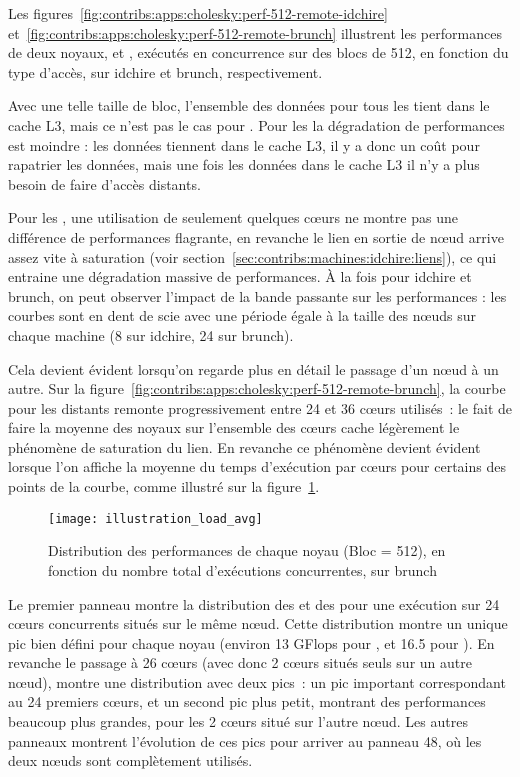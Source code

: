 Les figures~\ref{fig:contribs:apps:cholesky:perf-512-remote-idchire} et~\ref{fig:contribs:apps:cholesky:perf-512-remote-brunch} illustrent les performances de deux noyaux, \gemm et \potrf, exécutés en concurrence sur des blocs de 512, en fonction du type d'accès, sur idchire et brunch, respectivement.

Avec une telle taille de bloc, l'ensemble des données pour tous les \potrf tient dans le cache L3, mais ce n'est pas le cas pour \gemm.
Pour les \potrf la dégradation de performances est moindre : les données tiennent dans le cache L3, il y a donc un coût pour rapatrier les données, mais une fois les données dans le cache L3 il n'y a plus besoin de faire d'accès distants.

Pour les \gemm, une utilisation de seulement quelques cœurs ne montre pas une différence de performances flagrante, en revanche le lien en sortie de nœud arrive assez vite à saturation (voir section~\ref{sec:contribs:machines:idchire:liens}), ce qui entraine une dégradation massive de performances.
À la fois pour idchire et brunch, on peut observer l'impact de la bande passante sur les performances : les courbes sont en dent de scie avec une période égale à la taille des nœuds sur chaque machine (8 sur idchire, 24 sur brunch).

Cela devient évident lorsqu'on regarde plus en détail le passage d'un nœud à un autre.
Sur la figure~\ref{fig:contribs:apps:cholesky:perf-512-remote-brunch}, la courbe pour les \gemm distants remonte progressivement entre 24 et 36 cœurs utilisés~: le fait de faire la moyenne des noyaux sur l'ensemble des cœurs cache légèrement le phénomène de saturation du lien.
En revanche ce phénomène devient évident lorsque l'on affiche la moyenne du temps d'exécution par cœurs pour certains des points de la courbe, comme illustré sur la figure~\ref{fig:contribs:apps:cholesky:distrib-load-512}.

\begin{figure}[ht]
  \centering
  \texttt{[image: illustration\_load\_avg]}
  \caption{Distribution des performances de chaque noyau (Bloc = 512), en fonction du nombre total d'exécutions concurrentes, sur brunch}\label{fig:contribs:apps:cholesky:distrib-load-512}
\end{figure}

Le premier panneau montre la distribution des \gemm et des \potrf pour une exécution sur 24 cœurs concurrents situés sur le même nœud.
Cette distribution montre un unique pic bien défini pour chaque noyau (environ 13 GFlops pour \potrf, et 16.5 pour \gemm).
En revanche le passage à 26 cœurs (avec donc 2 cœurs situés seuls sur un autre nœud), montre une distribution avec deux pics~: un pic important correspondant au 24 premiers cœurs, et un second pic plus petit, montrant des performances beaucoup plus grandes, pour les 2 cœurs situé sur l'autre nœud.
Les autres panneaux montrent l'évolution de ces pics pour arriver au panneau 48, où les deux nœuds sont complètement utilisés.

